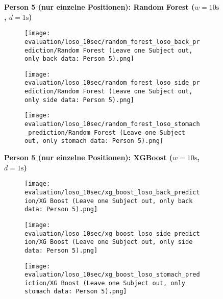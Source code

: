 \begin{figure}
    \textbf{Person 5 (nur einzelne Positionen): Random Forest ($w=10\si{\s}$, $d=1\si{\s}$)}
      \centering
      \begin{subfigure}{1\textwidth}
          \texttt{[image: evaluation/loso\_10sec/random\_forest\_loso\_back\_prediction/Random Forest (Leave one Subject out, only back data: Person 5).png]}
        \end{subfigure}
        \begin{subfigure}{1\textwidth}
          \texttt{[image: evaluation/loso\_10sec/random\_forest\_loso\_side\_prediction/Random Forest (Leave one Subject out, only side data: Person 5).png]}
        \end{subfigure}
        \begin{subfigure}{1\textwidth}
          \texttt{[image: evaluation/loso\_10sec/random\_forest\_loso\_stomach\_prediction/Random Forest (Leave one Subject out, only stomach data: Person 5).png]}
      \end{subfigure}
        \textbf{Person 5 (nur einzelne Positionen): XGBoost ($w=10\si{\s}$, $d=1\si{\s}$)}
      \centering
      \begin{subfigure}{1\textwidth}
          \texttt{[image: evaluation/loso\_10sec/xg\_boost\_loso\_back\_prediction/XG Boost (Leave one Subject out, only back data: Person 5).png]}
        \end{subfigure}
        \begin{subfigure}{1\textwidth}
            \texttt{[image: evaluation/loso\_10sec/xg\_boost\_loso\_side\_prediction/XG Boost (Leave one Subject out, only side data: Person 5).png]}
        \end{subfigure}
        \begin{subfigure}{1\textwidth}
            \texttt{[image: evaluation/loso\_10sec/xg\_boost\_loso\_stomach\_prediction/XG Boost (Leave one Subject out, only stomach data: Person 5).png]}
      \end{subfigure}
  
      \label{evaluation:xgboost_loso:person6}
\end{figure}